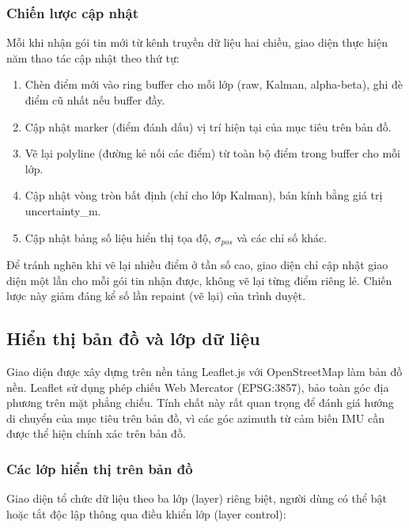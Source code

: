 \subsubsection{Chiến lược cập nhật}

\hspace{0.5cm} Mỗi khi nhận gói tin mới từ kênh truyền dữ liệu hai chiều, giao diện thực hiện năm thao tác cập nhật theo thứ tự:

\begin{enumerate}
    \item Chèn điểm mới vào ring buffer cho mỗi lớp (raw, Kalman, alpha-beta), ghi đè điểm cũ nhất nếu buffer đầy.
    \item Cập nhật marker (điểm đánh dấu) vị trí hiện tại của mục tiêu trên bản đồ.
    \item Vẽ lại polyline (đường kẻ nối các điểm) từ toàn bộ điểm trong buffer cho mỗi lớp.
    \item Cập nhật vòng tròn bất định (chỉ cho lớp Kalman), bán kính bằng giá trị uncertainty\_m.
    \item Cập nhật bảng số liệu hiển thị tọa độ, $\sigma_{pos}$ và các chỉ số khác.
\end{enumerate}

Để tránh nghẽn khi vẽ lại nhiều điểm ở tần số cao, giao diện chỉ cập nhật giao diện một lần cho mỗi gói tin nhận được, không vẽ lại từng điểm riêng lẻ. Chiến lược này giảm đáng kể số lần repaint (vẽ lại) của trình duyệt.

\subsection{Hiển thị bản đồ và lớp dữ liệu}

\hspace{0.5cm} Giao diện được xây dựng trên nền tảng Leaflet.js với OpenStreetMap làm bản đồ nền. Leaflet sử dụng phép chiếu Web Mercator (EPSG:3857), bảo toàn góc địa phương trên mặt phẳng chiếu. Tính chất này rất quan trọng để đánh giá hướng di chuyển của mục tiêu trên bản đồ, vì các góc azimuth từ cảm biến IMU cần được thể hiện chính xác trên bản đồ.

\subsubsection{Các lớp hiển thị trên bản đồ}

\hspace{0.5cm} Giao diện tổ chức dữ liệu theo ba lớp (layer) riêng biệt, người dùng có thể bật hoặc tắt độc lập thông qua điều khiển lớp (layer control):

